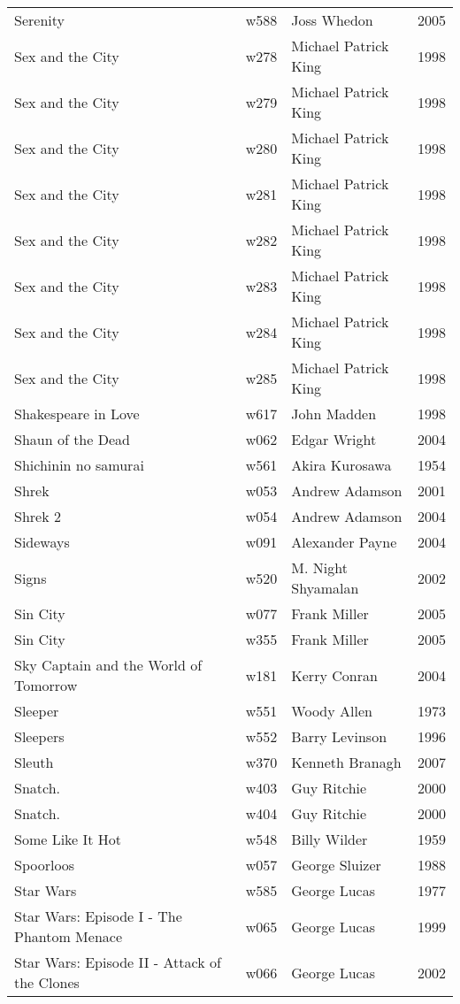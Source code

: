 \documentclass{article}
\begin{document}
\begin {center}
\begin{longtable}{p{10cm} l l l}
Serenity & w588 & Joss Whedon & 2005 \\
Sex and the City & w278 & Michael Patrick King & 1998 \\
Sex and the City & w279 & Michael Patrick King & 1998 \\
Sex and the City & w280 & Michael Patrick King & 1998 \\
Sex and the City & w281 & Michael Patrick King & 1998 \\
Sex and the City & w282 & Michael Patrick King & 1998 \\
Sex and the City & w283 & Michael Patrick King & 1998 \\
Sex and the City & w284 & Michael Patrick King & 1998 \\
Sex and the City & w285 & Michael Patrick King & 1998 \\
Shakespeare in Love & w617 & John Madden & 1998 \\
Shaun of the Dead & w062 & Edgar Wright & 2004 \\
Shichinin no samurai & w561 & Akira Kurosawa & 1954 \\
Shrek & w053 & Andrew Adamson & 2001 \\
Shrek 2 & w054 & Andrew Adamson & 2004 \\
Sideways & w091 & Alexander Payne & 2004 \\
Signs & w520 & M. Night Shyamalan & 2002 \\
Sin City & w077 & Frank Miller & 2005 \\
Sin City & w355 & Frank Miller & 2005 \\
Sky Captain and the World of Tomorrow & w181 & Kerry Conran & 2004 \\
Sleeper & w551 & Woody Allen & 1973 \\
Sleepers & w552 & Barry Levinson & 1996 \\
Sleuth & w370 & Kenneth Branagh & 2007 \\
Snatch. & w403 & Guy Ritchie & 2000 \\
Snatch. & w404 & Guy Ritchie & 2000 \\
Some Like It Hot & w548 & Billy Wilder & 1959 \\
Spoorloos & w057 & George Sluizer & 1988 \\
Star Wars & w585 & George Lucas & 1977 \\
Star Wars: Episode I - The Phantom Menace & w065 & George Lucas & 1999 \\
Star Wars: Episode II - Attack of the Clones & w066 & George Lucas & 2002 \\

\end{longtable}
\end{center}
\end{document}
